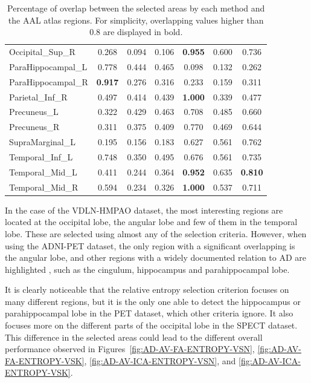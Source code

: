 \begin{table}
\begin{tabularx}{\textwidth}{Xcccccc}
Occipital\_Sup\_R   &    0.268 &    0.094 &  0.106 &      \textbf{0.955} &    0.600 &  0.736 \\
ParaHippocampal\_L &    0.778 &    0.444 &  0.465 &      0.098 &    0.132 &  0.262 \\
ParaHippocampal\_R &    \textbf{0.917} &    0.276 &  0.316 &      0.233 &    0.159 &  0.311 \\
Parietal\_Inf\_R    &    0.497 &    0.414 &  0.439 &      \textbf{1.000} &    0.339 &  0.477 \\
Precuneus\_L       &    0.322 &    0.429 &  0.463 &      0.708 &    0.485 &  0.660 \\
Precuneus\_R       &    0.311 &    0.375 &  0.409 &      0.770 &    0.469 &  0.644 \\
SupraMarginal\_L   &    0.195 &    0.156 &  0.183 &      0.627 &    0.561 &  0.762 \\
Temporal\_Inf\_L    &    0.748 &    0.350 &  0.495 &      0.676 &    0.561 &  0.735 \\
Temporal\_Mid\_L    &    0.411 &    0.244 &  0.364 &      \textbf{0.952} &    0.635 &  \textbf{0.810} \\
Temporal\_Mid\_R    &    0.594 &    0.234 &  0.326 &      \textbf{1.000} &    0.537 &  0.711 \\
	\bottomrule
\end{tabularx}
\caption[Percentage of overlap between the selected areas by each method and the AAL atlas regions.]{Percentage of overlap between the selected areas by each method and the AAL atlas regions. For simplicity, overlapping values higher than 0.8 are displayed in bold.}
\label{tab:overlapVDLNAD}
\end{table} 

In the case of the VDLN-HMPAO dataset, the most interesting regions are located at the occipital lobe, the angular lobe and few of them in the temporal lobe. These are selected using almost any of the selection criteria. However, when using the ADNI-PET dataset, the only region with a significant overlapping is the angular lobe, and other regions with a widely documented relation to \ac{AD} are highlighted \cite{Dubois2007,Claus1994}, such as the cingulum, hippocampus and parahippocampal lobe. 

It is clearly noticeable that the relative entropy selection criterion focuses on many different regions, but it is the only one able to detect the hippocampus or parahippocampal lobe in the \ac{PET} dataset, which other criteria ignore. It also focuses more on the different parts of the occipital lobe in the \ac{SPECT} dataset. This difference in the selected areas could lead to the different overall performance observed in Figures~\ref{fig:AD-AV-FA-ENTROPY-VSN}, \ref{fig:AD-AV-FA-ENTROPY-VSK}, \ref{fig:AD-AV-ICA-ENTROPY-VSN}, and \ref{fig:AD-AV-ICA-ENTROPY-VSK}.


